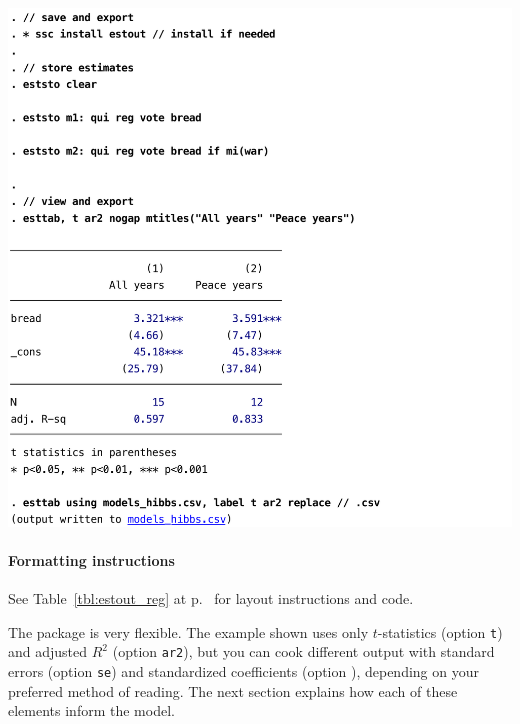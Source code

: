 \begin{table}[htp]
	\includegraphics[scale=.5]{images/hibbs_yx1_estout.pdf}

	\caption[Storing estimates with ]{\label{tbl:hibbs_yx1_estout}%
    Storing and exporting estimates with . %
	  See  and related online documentation for options. %
    \emph{Note:} the  command is muted by the  command in this code; %
    its output does not show up on screen, but the command ran `silently' in the background. %
    \hibbs}
\end{table}%

\paragraph{Formatting instructions} See Table~\ref{tbl:estout_reg} at p.~\pageref{tbl:estout_reg} for layout instructions and code.

The  package is very flexible. The example shown uses only $t$-statistics (option \texttt{t}) and adjusted $R^2$ (option \texttt{ar2}), but you can cook different output with standard errors (option \texttt{se}) and standardized coefficients (option ), depending on your preferred method of reading. The next section explains how each of these elements inform the model.

